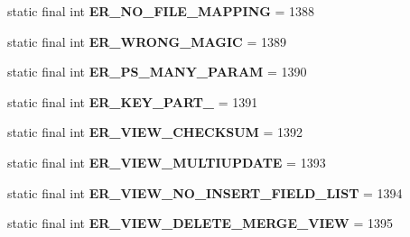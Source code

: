 \begin{DoxyCompactItemize}
static final int {\bfseries E\+R\+\_\+\+N\+O\+\_\+\+F\+I\+L\+E\+\_\+\+M\+A\+P\+P\+I\+NG} = 1388
\item 
\mbox{\label{classcom_1_1mysql_1_1jdbc_1_1_mysql_error_numbers_a2f1b9f47c1a475f6361978b05cf2f652}} 
static final int {\bfseries E\+R\+\_\+\+W\+R\+O\+N\+G\+\_\+\+M\+A\+G\+IC} = 1389
\item 
\mbox{\label{classcom_1_1mysql_1_1jdbc_1_1_mysql_error_numbers_a523cab5443996be447eaeb37c1c12e5b}} 
static final int {\bfseries E\+R\+\_\+\+P\+S\+\_\+\+M\+A\+N\+Y\+\_\+\+P\+A\+R\+AM} = 1390
\item 
\mbox{\label{classcom_1_1mysql_1_1jdbc_1_1_mysql_error_numbers_ad68b7de8e6fe12576b3f47fa0cca0387}} 
static final int {\bfseries E\+R\+\_\+\+K\+E\+Y\+\_\+\+P\+A\+R\+T\+\_} = 1391
\item 
\mbox{\label{classcom_1_1mysql_1_1jdbc_1_1_mysql_error_numbers_a13797a0f8d700bc6b546ae543838f203}} 
static final int {\bfseries E\+R\+\_\+\+V\+I\+E\+W\+\_\+\+C\+H\+E\+C\+K\+S\+UM} = 1392
\item 
\mbox{\label{classcom_1_1mysql_1_1jdbc_1_1_mysql_error_numbers_a0d50a6f4faf3de1547d07c02e1280cc7}} 
static final int {\bfseries E\+R\+\_\+\+V\+I\+E\+W\+\_\+\+M\+U\+L\+T\+I\+U\+P\+D\+A\+TE} = 1393
\item 
\mbox{\label{classcom_1_1mysql_1_1jdbc_1_1_mysql_error_numbers_a107fa770e817e953a9121b0335782b9d}} 
static final int {\bfseries E\+R\+\_\+\+V\+I\+E\+W\+\_\+\+N\+O\+\_\+\+I\+N\+S\+E\+R\+T\+\_\+\+F\+I\+E\+L\+D\+\_\+\+L\+I\+ST} = 1394
\item 
\mbox{\label{classcom_1_1mysql_1_1jdbc_1_1_mysql_error_numbers_a8f24735ff01cbe1dd1eec2f323b8023a}} 
static final int {\bfseries E\+R\+\_\+\+V\+I\+E\+W\+\_\+\+D\+E\+L\+E\+T\+E\+\_\+\+M\+E\+R\+G\+E\+\_\+\+V\+I\+EW} = 1395
\item 
\mbox{\label{classcom_1_1mysql_1_1jdbc_1_1_mysql_error_numbers_a8f04071ce7d9a1eaa9a4a8445c28a706}} 

\end{DoxyCompactItemize}
